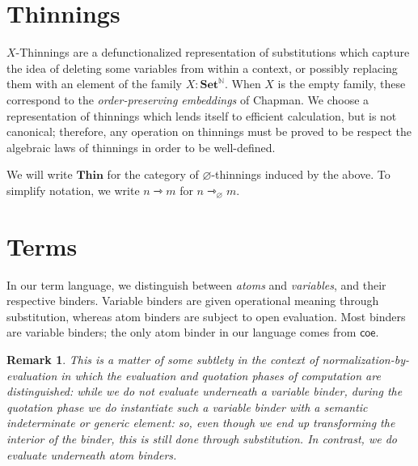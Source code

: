 \documentclass{article}
\DeclarePairedDelimiter\Squares{[}{]}
\newtheorem{remark}{Remark}
\newcommand\FmtKwd[1]{\mathsf{#1}}
\newcommand\DeclBox[1]{\framebox{$\displaystyle{}#1$}}
\newcommand\FmtThin[1]{{\color{ProcessBlue}#1}}
\newcommand\XThin[3]{{#2}\rightarrowtriangle_{#1}{#3}}
\newcommand\Thin[2]{{#1}\rightarrowtriangle{#2}}
\newcommand\IsXThin[4]{\FmtThin{#1}:\XThin{#2}{#3}{#4}}
\newcommand\ThinId{\mathsf{id}}
\newcommand\ThinKeep[1]{\mbox{\leftthumbsdown}\!\!\rangle\!{#1}\!\langle\!\!\mbox{\rightthumbsdown}}
\newcommand\ThinSkip[1]{{#1}.\mbox{\faTrashO}}
\newcommand\ThinRep[2]{{#1}.\Squares*{{\normalcolor{}#2}}}
\newcommand\THIN{\mathbf{Thin}}
\newcommand\SET{\mathbf{Set}}
\begin{document}
\section{Thinnings}

$X$-Thinnings are a defunctionalized representation of substitutions
which capture the idea of deleting some variables from within a
context, or possibly replacing them with an element of the family
$X:\SET^{\mathbb{N}}$. When $X$ is the empty family, these correspond
to the \emph{order-preserving embeddings} of Chapman.
%
We choose a representation of thinnings which lends itself to
efficient calculation, but is not canonical; therefore, any operation
on thinnings must be proved to be respect the algebraic laws of
thinnings in order to be well-defined.

We will write $\THIN$ for the category of $\varnothing$-thinnings
induced by the above. To simplify notation, we write $\Thin{n}{m}$ for
$\XThin{\varnothing}{n}{m}$.

\section{Terms}


In our term language, we distinguish between \emph{atoms} and
\emph{variables}, and their respective binders. Variable binders are
given operational meaning through substitution, whereas atom binders
are subject to open evaluation. Most binders are variable binders; the
only atom binder in our language comes from $\FmtKwd{coe}$.


\begin{remark}
  This is a matter of some subtlety in the context of
  \emph{normalization-by-evaluation} in which the evaluation and
  quotation phases of computation are distinguished: while we do not
  evaluate underneath a variable binder, during the quotation phase we
  \emph{do} instantiate such a variable binder with a semantic
  indeterminate or generic element: so, even though we end up
  transforming the interior of the binder, this is still done through
  substitution. In contrast, we do evaluate underneath atom binders.
\end{remark}
\end{document}
